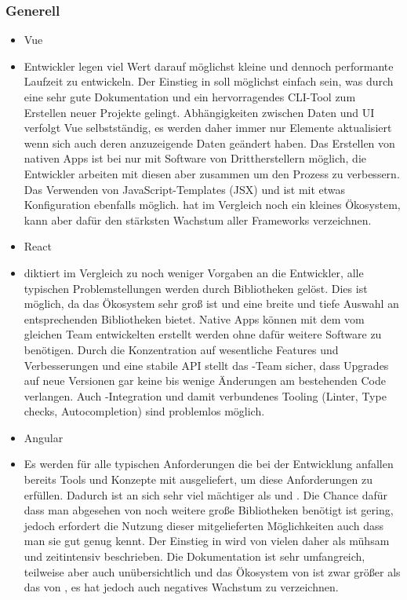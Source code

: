 \subsubsection{Generell}
\begin{itemize}
    \item{Vue}
    \item[] Entwickler legen viel Wert darauf möglichst kleine und dennoch performante Laufzeit zu entwickeln. Der Einstieg in  soll möglichst einfach sein, was durch eine sehr gute Dokumentation und ein hervorragendes CLI-Tool zum Erstellen neuer Projekte gelingt. Abhängigkeiten zwischen Daten und UI verfolgt Vue selbstständig, es werden daher immer nur Elemente aktualisiert wenn sich auch deren anzuzeigende Daten geändert haben. Das Erstellen von nativen Apps ist bei  nur mit Software von Drittherstellern möglich, die Entwickler arbeiten mit diesen aber zusammen um den Prozess zu verbessern. Das Verwenden von JavaScript-Templates (JSX) und  ist mit etwas Konfiguration ebenfalls möglich.  hat im Vergleich noch ein kleines Ökosystem, kann aber dafür den stärksten Wachstum aller Frameworks verzeichnen.
    \item{React}
    \item[]  diktiert im Vergleich zu  noch weniger Vorgaben an die Entwickler, alle typischen Problemstellungen werden durch Bibliotheken gelöst. Dies ist möglich, da das Ökosystem sehr groß ist und eine breite und tiefe Auswahl an entsprechenden Bibliotheken bietet. Native Apps können mit dem vom gleichen Team entwickelten  erstellt werden ohne dafür weitere Software zu benötigen. Durch die Konzentration auf wesentliche Features und Verbesserungen und eine stabile API stellt das -Team sicher, dass Upgrades auf neue Versionen gar keine bis wenige Änderungen am bestehenden Code verlangen. Auch -Integration und damit verbundenes Tooling (Linter, Type checks, Autocompletion) sind problemlos möglich.
    \item{Angular}
    \item[] Es werden für alle typischen Anforderungen die bei der Entwicklung anfallen bereits Tools und Konzepte mit ausgeliefert, um diese Anforderungen zu erfüllen. Dadurch ist  an sich sehr viel mächtiger als  und . Die Chance dafür dass man abgesehen von  noch weitere große Bibliotheken benötigt ist gering, jedoch erfordert die Nutzung dieser mitgelieferten Möglichkeiten auch dass man sie gut genug kennt. Der Einstieg in  wird von vielen daher als mühsam und zeitintensiv beschrieben. Die Dokumentation ist sehr umfangreich, teilweise aber auch unübersichtlich und das Ökosystem von  ist zwar größer als das von , es hat jedoch auch negatives Wachstum zu verzeichnen.
\end{itemize}

